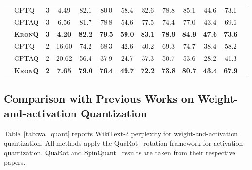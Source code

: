\documentclass{article} %
\newcommand{\KronQ}{\textsc{KronQ}}
\begin{document}
\begin{table}[H]
{\begin{NiceTabular}{l||l|c|c|ccccccccr}
 & GPTQ  & 3 & 4.49 & 82.1 & 80.0 & 58.4 & 82.6 & 78.8 & 85.1 & 44.6 & 73.1 \\
 & GPTAQ & 3 & 6.56 & 81.7 & 78.8 & 54.6 & 77.5 & 74.4 & 77.0 & 43.4 & 69.6 \\
 & \textbf{\KronQ} & \textbf{3} & \textbf{4.20} & \textbf{82.2} & \textbf{79.5} & \textbf{59.0} & \textbf{83.1} & \textbf{78.9} & \textbf{84.9} & \textbf{47.6} & \textbf{73.6} \\
 & GPTQ  & 2 & 16.60 & 74.2 & 68.3 & 42.6 & 40.2 & 69.3 & 74.7 & 38.4 & 58.2 \\
 & GPTAQ & 2 & 20.62 & 56.4 & 37.9 & 24.7 & 37.3 & 50.7 & 53.6 & 28.2 & 41.3 \\
 & \textbf{\KronQ} & \textbf{2} & \textbf{7.65} & \textbf{79.0} & \textbf{76.4} & \textbf{49.7} & \textbf{72.2} & \textbf{73.8} & \textbf{80.7} & \textbf{43.4} & \textbf{67.9} \\
\bottomrule
\end{NiceTabular}}
\end{table}

\subsection{Comparison with Previous Works on Weight-and-activation Quantization}
\label{appendix:comp_wa}
Table~\ref{tab:wa_quant} reports WikiText-2 perplexity for weight-and-activation quantization. All methods apply the QuaRot~\citep{ashkboos2024quarot} rotation framework for activation quantization. QuaRot and SpinQuant~\citep{liu2024spinquant} results are taken from their respective papers. %
\end{document}
